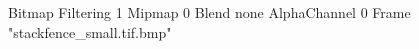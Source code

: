 {Bitmap
	{Filtering 1}
	{Mipmap 0}
	{Blend none}
	{AlphaChannel 0}
	{Frame "stackfence_small.tif.bmp"}
}
